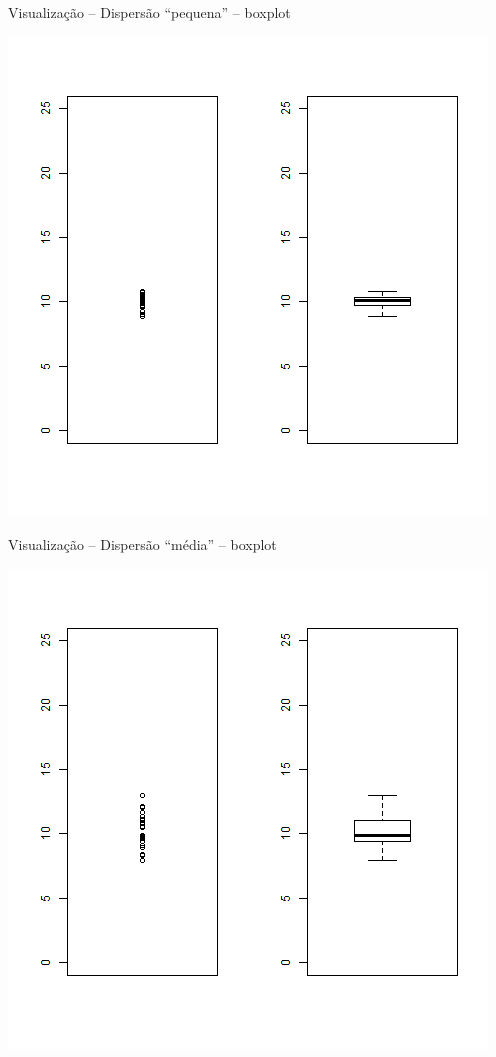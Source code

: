 \documentclass{beamer}
\begin{document}
\begin{frame}{\scriptsize Visualização -- Dispersão ``pequena'' -- boxplot}
  \begin{center}
    \includegraphics[height=.8\textheight]{Cap17/dot-box-P}
  \end{center}
\end{frame}

\begin{frame}{\scriptsize Visualização -- Dispersão ``média'' -- boxplot}
  \begin{center}
    \includegraphics[height=.8\textheight]{Cap17/dot-box-M}
  \end{center}
\end{frame}
\end{document}

